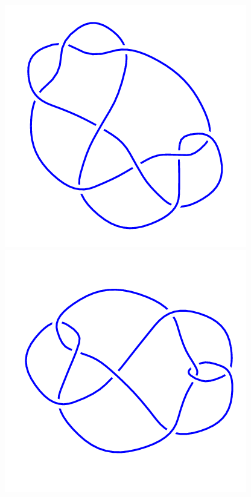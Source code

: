 \begin{figure}[H]
	\begin{minipage}[b]{.18\linewidth}
		\centering
		\includegraphics[width=\linewidth]{../data/9_26.png}
	\end{minipage}
	\begin{minipage}[b]{.18\linewidth}
		\centering
		\includegraphics[width=\linewidth]{../data/9_27.png}

\end{minipage}
\end{figure}
